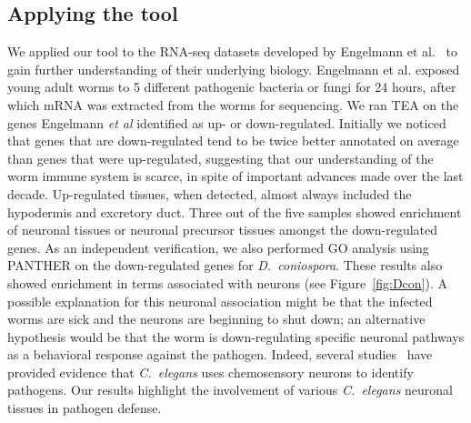 \documentclass{bmcart}
\begin{document}
\subsection*{Applying the tool}
We applied our tool to the RNA-seq datasets developed by Engelmann et al.~\cite{Engelmann2011} to gain further understanding of their underlying biology. Engelmann et al. exposed young adult worms to 5 different pathogenic bacteria or fungi for 24 hours, after which mRNA was extracted from the worms for sequencing. We ran TEA on the genes Engelmann \emph{et al} identified as up- or down-regulated. Initially we noticed that genes that are down-regulated tend to be twice better annotated on average than genes that were up-regulated, suggesting that our understanding of the worm immune system is scarce, in spite of important advances made over the last decade. Up-regulated tissues, when detected, almost always included the hypodermis and excretory duct. Three out of the five samples showed enrichment of neuronal tissues or neuronal precursor tissues amongst the down-regulated genes. As an independent verification, we also performed GO analysis using PANTHER on the down-regulated genes for \emph{D.~coniospora}. These results also showed enrichment in terms associated with neurons (see Figure~\ref{fig:Dcon}). A possible explanation for this neuronal association might be that the infected worms are sick and the neurons are beginning to shut down; an alternative hypothesis would be that the worm is down-regulating specific neuronal pathways as a behavioral response against the pathogen. Indeed, several studies~\cite{Meisel2014, Zhang2005} have provided evidence that \emph{C.~elegans} uses chemosensory neurons to identify pathogens. %
Our results highlight the involvement of various \emph{C.~elegans} neuronal tissues in pathogen defense.
\end{document}
